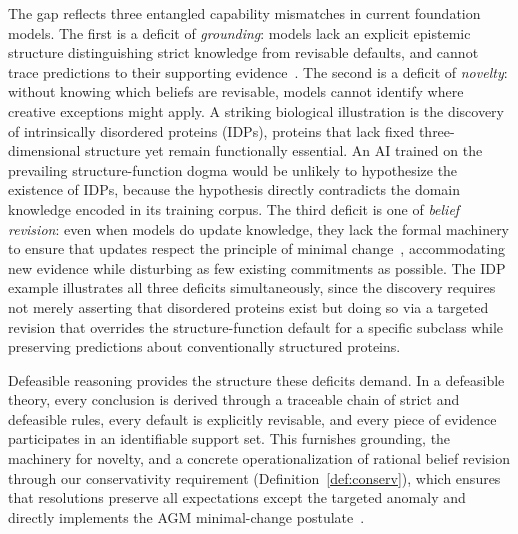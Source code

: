 \documentclass{article}
\theoremstyle{definition}
\begin{document}
The gap reflects three entangled capability mismatches in current foundation models. The first is a deficit of \emph{grounding}: models lack an explicit epistemic structure distinguishing strict knowledge from revisable defaults, and cannot trace predictions to their supporting evidence~\citep{dunker2001intrinsically}. The second is a deficit of \emph{novelty}: without knowing which beliefs are revisable, models cannot identify where creative exceptions might apply. A striking biological illustration is the discovery of intrinsically disordered proteins (IDPs), proteins that lack fixed three-dimensional structure yet remain functionally essential. An AI trained on the prevailing structure-function dogma would be unlikely to hypothesize the existence of IDPs, because the hypothesis directly contradicts the domain knowledge encoded in its training corpus. The third deficit is one of \emph{belief revision}: even when models do update knowledge, they lack the formal machinery to ensure that updates respect the principle of minimal change~\citep{alchourron1985logic}, accommodating new evidence while disturbing as few existing commitments as possible. The IDP example illustrates all three deficits simultaneously, since the discovery requires not merely asserting that disordered proteins exist but doing so via a targeted revision that overrides the structure-function default for a specific subclass while preserving predictions about conventionally structured proteins.

Defeasible reasoning provides the structure these deficits demand. In a defeasible theory, every conclusion is derived through a traceable chain of strict and defeasible rules, every default is explicitly revisable, and every piece of evidence participates in an identifiable support set. This furnishes grounding, the machinery for novelty, and a concrete operationalization of rational belief revision through our conservativity requirement (Definition~\ref{def:conserv}), which ensures that resolutions preserve all expectations except the targeted anomaly and directly implements the AGM minimal-change postulate~\citep{gardenfors1988knowledge, katsuno1991propositional}.
\end{document}
